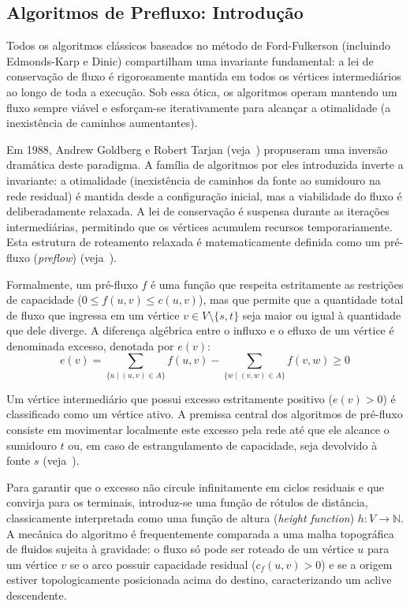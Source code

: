 \documentclass[12pt,a4paper]{article}
\begin{document}
\subsection{Algoritmos de Prefluxo: Introdução}

Todos os algoritmos clássicos baseados no método de Ford-Fulkerson (incluindo Edmonds-Karp e Dinic) compartilham uma invariante fundamental: a lei de conservação de fluxo é rigorosamente mantida em todos os vértices intermediários ao longo de toda a execução. Sob essa ótica, os algoritmos operam mantendo um fluxo sempre viável e esforçam-se iterativamente para alcançar a otimalidade (a inexistência de caminhos aumentantes).

Em 1988, Andrew Goldberg e Robert Tarjan (veja~\cite{goldberg1988new}) propuseram uma inversão dramática deste paradigma. A família de algoritmos por eles introduzida inverte a invariante: a otimalidade (inexistência de caminhos da fonte ao sumidouro na rede residual) é mantida desde a configuração inicial, mas a viabilidade do fluxo é deliberadamente relaxada. A lei de conservação é suspensa durante as iterações intermediárias, permitindo que os vértices acumulem recursos temporariamente. Esta estrutura de roteamento relaxada é matematicamente definida como um pré-fluxo (\textit{preflow}) (veja~\cite{ahuja1993network}).

Formalmente, um pré-fluxo $f$ é uma função que respeita estritamente as restrições de capacidade ($0 \le f(u,v) \le c(u,v)$), mas que permite que a quantidade total de fluxo que ingressa em um vértice $v \in V \setminus \{s, t\}$ seja maior ou igual à quantidade que dele diverge. A diferença algébrica entre o influxo e o efluxo de um vértice é denominada excesso, denotada por $e(v)$:
\begin{equation}
    e(v) = \sum_{\{u \mid (u,v) \in A\}} f(u,v) - \sum_{\{w \mid (v,w) \in A\}} f(v,w) \ge 0
\end{equation}

Um vértice intermediário que possui excesso estritamente positivo ($e(v) > 0$) é classificado como um vértice ativo. A premissa central dos algoritmos de pré-fluxo consiste em movimentar localmente este excesso pela rede até que ele alcance o sumidouro $t$ ou, em caso de estrangulamento de capacidade, seja devolvido à fonte $s$ (veja~\cite{cook1998combinatorial}).

Para garantir que o excesso não circule infinitamente em ciclos residuais e que convirja para os terminais, introduz-se uma função de rótulos de distância, classicamente interpretada como uma função de altura (\textit{height function}) $h: V \rightarrow \mathbb{N}$. A mecânica do algoritmo é frequentemente comparada a uma malha topográfica de fluidos sujeita à gravidade: o fluxo só pode ser roteado de um vértice $u$ para um vértice $v$ se o arco possuir capacidade residual ($c_f(u,v) > 0$) e se a origem estiver topologicamente posicionada acima do destino, caracterizando um aclive descendente.
\end{document}
